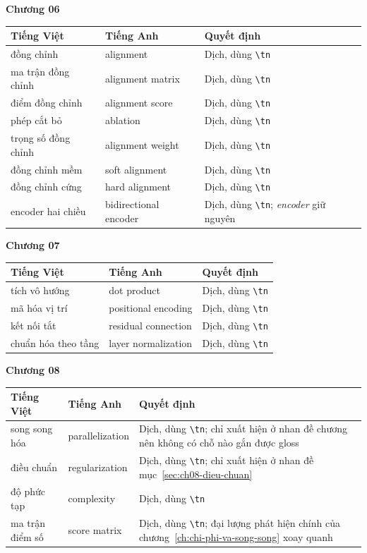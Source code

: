 \bigskip
\textbf{Chương 06}

\footnotesize
\begin{tabular}{@{}llp{4cm}@{}}
\toprule
Tiếng Việt & Tiếng Anh & Quyết định \\
\midrule
đồng chỉnh & alignment & Dịch, dùng \texttt{\textbackslash tn} \\
ma trận đồng chỉnh & alignment matrix & Dịch, dùng \texttt{\textbackslash tn} \\
điểm đồng chỉnh & alignment score & Dịch, dùng \texttt{\textbackslash tn} \\
phép cắt bỏ & ablation & Dịch, dùng \texttt{\textbackslash tn} \\
trọng số đồng chỉnh & alignment weight & Dịch, dùng \texttt{\textbackslash tn} \\
đồng chỉnh mềm & soft alignment & Dịch, dùng \texttt{\textbackslash tn} \\
đồng chỉnh cứng & hard alignment & Dịch, dùng \texttt{\textbackslash tn} \\
encoder hai chiều & bidirectional encoder & Dịch, dùng \texttt{\textbackslash tn}; \emph{encoder} giữ nguyên \\
\bottomrule
\end{tabular}
\normalsize

\bigskip
\textbf{Chương 07}

\footnotesize
\begin{tabular}{@{}llp{4cm}@{}}
\toprule
Tiếng Việt & Tiếng Anh & Quyết định \\
\midrule
tích vô hướng & dot product & Dịch, dùng \texttt{\textbackslash tn} \\
mã hóa vị trí & positional encoding & Dịch, dùng \texttt{\textbackslash tn} \\
kết nối tắt & residual connection & Dịch, dùng \texttt{\textbackslash tn} \\
chuẩn hóa theo tầng & layer normalization & Dịch, dùng \texttt{\textbackslash tn} \\
\bottomrule
\end{tabular}
\normalsize

\bigskip
\textbf{Chương 08}

\footnotesize
\begin{tabular}{@{}llp{4cm}@{}}
\toprule
Tiếng Việt & Tiếng Anh & Quyết định \\
\midrule
song song hóa & parallelization & Dịch, dùng \texttt{\textbackslash tn}; chỉ xuất hiện ở nhan đề chương nên không có chỗ nào gắn được gloss \\
điều chuẩn & regularization & Dịch, dùng \texttt{\textbackslash tn}; chỉ xuất hiện ở nhan đề mục~\ref{sec:ch08-dieu-chuan} \\
độ phức tạp & complexity & Dịch, dùng \texttt{\textbackslash tn} \\
ma trận điểm số & score matrix & Dịch, dùng \texttt{\textbackslash tn}; đại lượng phát hiện chính của chương~\ref{ch:chi-phi-va-song-song} xoay quanh \\
\bottomrule
\end{tabular}
\normalsize

